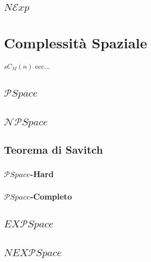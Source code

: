 \documentclass{article}  %
\theoremstyle{definition}
\begin{document}
\subsection{$N \mathcal{E}xp$}
\break
\section{Complessità Spaziale}
$sC_M(n)$ ecc...
\subsection{$\mathcal{P}Space$}
\subsection{$\mathcal{NP}Space$}
\subsection{Teorema di Savitch}
\subsubsection{$\mathcal{P}Space$-Hard}
\subsubsection{$\mathcal{P}Space$-Completo}
\subsection{$EX\mathcal{P}Space$}
\subsection{$NEX\mathcal{P}Space$}
\end{document}
